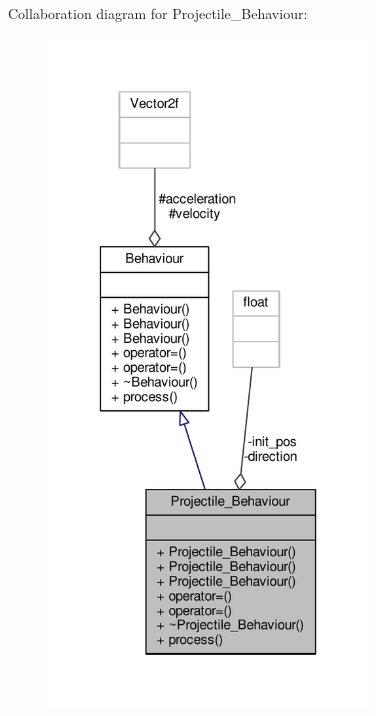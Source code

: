 Collaboration diagram for Projectile\+\_\+\+Behaviour\+:\nopagebreak
\begin{figure}[H]
\begin{center}
\leavevmode
\includegraphics[width=240pt]{classProjectile__Behaviour__coll__graph}
\end{center}
\end{figure}
